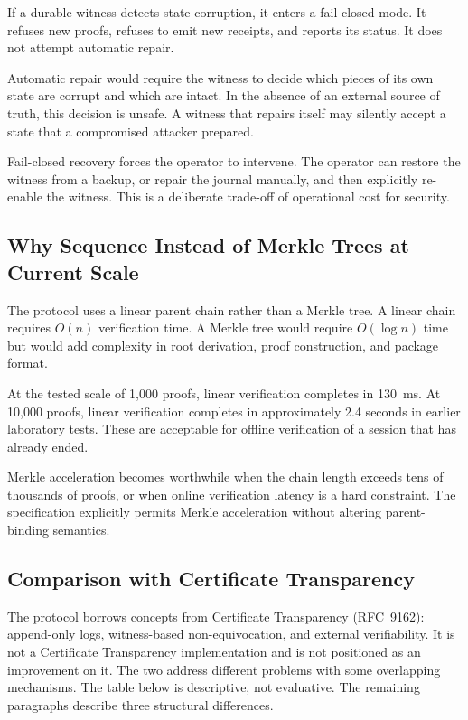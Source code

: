 \documentclass[11pt,a4paper]{article}
\begin{document}
If a durable witness detects state corruption, it enters a fail-closed mode. It refuses new proofs, refuses to emit new receipts, and reports its status. It does not attempt automatic repair.

Automatic repair would require the witness to decide which pieces of its own state are corrupt and which are intact. In the absence of an external source of truth, this decision is unsafe. A witness that repairs itself may silently accept a state that a compromised attacker prepared.

Fail-closed recovery forces the operator to intervene. The operator can restore the witness from a backup, or repair the journal manually, and then explicitly re-enable the witness. This is a deliberate trade-off of operational cost for security.

\subsection{Why Sequence Instead of Merkle Trees at Current Scale}

The protocol uses a linear parent chain rather than a Merkle tree. A linear chain requires $O(n)$ verification time. A Merkle tree would require $O(\log n)$ time but would add complexity in root derivation, proof construction, and package format.

At the tested scale of 1{,}000 proofs, linear verification completes in 130~ms. At 10{,}000 proofs, linear verification completes in approximately 2.4 seconds in earlier laboratory tests. These are acceptable for offline verification of a session that has already ended.

Merkle acceleration becomes worthwhile when the chain length exceeds tens of thousands of proofs, or when online verification latency is a hard constraint. The specification explicitly permits Merkle acceleration without altering parent-binding semantics.

\subsection{Comparison with Certificate Transparency}

The protocol borrows concepts from Certificate Transparency (RFC~9162): append-only logs, witness-based non-equivocation, and external verifiability. It is not a Certificate Transparency implementation and is not positioned as an improvement on it. The two address different problems with some overlapping mechanisms. The table below is descriptive, not evaluative. The remaining paragraphs describe three structural differences.
\end{document}
